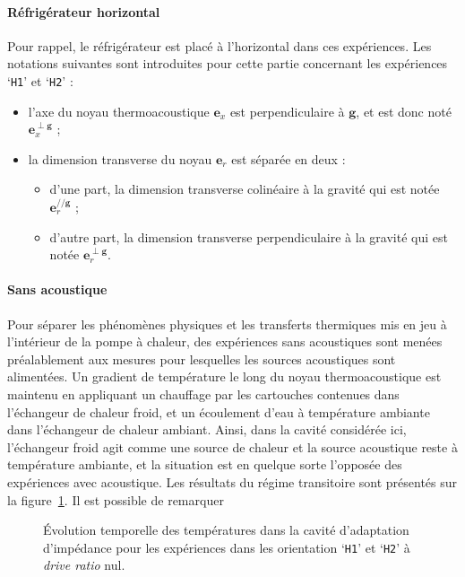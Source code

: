 \paragraph{Réfrigérateur horizontal}
Pour rappel, le réfrigérateur est placé à l'horizontal dans ces expériences. Les notations suivantes sont introduites pour cette partie concernant les expériences `\texttt{H1}' et `\texttt{H2}' :

\begin{itemize}
\item l'axe du noyau thermoacoustique $\mathbf e_x$ est perpendiculaire à $\mathbf g$, et est donc noté $\mathbf e_x^{\perp \mathbf g}$ ;
\item la dimension transverse du noyau $\mathbf e_r$ est séparée en deux :
	\begin{itemize}
	\item d'une part, la dimension transverse colinéaire à la gravité qui est notée $\mathbf e_r^{// \mathbf g}$ ;
	\item d'autre part, la dimension transverse perpendiculaire à la gravité qui est notée $\mathbf e_r^{\perp \mathbf g}$.
	\end{itemize}
\end{itemize}

\paragraph*{Sans acoustique}
Pour séparer les phénomènes physiques et les transferts thermiques mis en jeu à l'intérieur de la pompe à chaleur, des expériences sans acoustiques sont menées préalablement aux mesures pour lesquelles les sources acoustiques sont alimentées. Un gradient de température le long du noyau thermoacoustique est maintenu en appliquant un chauffage par les cartouches contenues dans l'échangeur de chaleur froid, et un écoulement d'eau à température ambiante dans l'échangeur de chaleur ambiant. Ainsi, dans la cavité considérée ici, l'échangeur froid agit comme une source de chaleur et la source acoustique reste à température ambiante, et la situation est en quelque sorte l'opposée des expériences avec acoustique. Les résultats du régime transitoire sont présentés sur la figure~\ref{fig:HeatOnly_CHXout_H1H2}. Il est possible de remarquer

\begin{figure}[!ht]
    \centering
    
    \caption{\'Evolution temporelle des températures dans la cavité d'adaptation d'impédance pour les expériences dans les orientation `\texttt{H1}' et `\texttt{H2}' à \textit{drive ratio} nul.}
    \label{fig:HeatOnly_CHXout_H1H2}
\end{figure}

